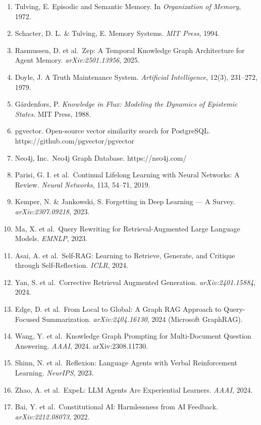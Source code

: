 \documentclass[11pt,a4paper]{article}
\begin{document}
\begin{enumerate}
  Laird, J. E. The SOAR Cognitive Architecture. \emph{MIT Press}, 2012.
\item
  Tulving, E. Episodic and Semantic Memory. In \emph{Organization of
  Memory}, 1972.
\item
  Schacter, D. L. \& Tulving, E. Memory Systems. \emph{MIT Press}, 1994.
\item
  Rasmussen, D. et al.~Zep: A Temporal Knowledge Graph Architecture for
  Agent Memory. \emph{arXiv:2501.13956}, 2025.
\item
  Doyle, J. A Truth Maintenance System. \emph{Artificial Intelligence},
  12(3), 231--272, 1979.
\item
  Gärdenfors, P. \emph{Knowledge in Flux: Modeling the Dynamics of
  Epistemic States}. MIT Press, 1988.
\item
  pgvector. Open-source vector similarity search for PostgreSQL.
  https://github.com/pgvector/pgvector
\item
  Neo4j, Inc.~Neo4j Graph Database. https://neo4j.com/
\item
  Parisi, G. I. et al.~Continual Lifelong Learning with Neural Networks:
  A Review. \emph{Neural Networks}, 113, 54--71, 2019.
\item
  Kemper, N. \& Jankowski, S. Forgetting in Deep Learning --- A Survey.
  \emph{arXiv:2307.09218}, 2023.
\item
  Ma, X. et al.~Query Rewriting for Retrieval-Augmented Large Language
  Models. \emph{EMNLP}, 2023.
\item
  Asai, A. et al.~Self-RAG: Learning to Retrieve, Generate, and Critique
  through Self-Reflection. \emph{ICLR}, 2024.
\item
  Yan, S. et al.~Corrective Retrieval Augmented Generation.
  \emph{arXiv:2401.15884}, 2024.
\item
  Edge, D. et al.~From Local to Global: A Graph RAG Approach to
  Query-Focused Summarization. \emph{arXiv:2404.16130}, 2024 (Microsoft
  GraphRAG).
\item
  Wang, Y. et al.~Knowledge Graph Prompting for Multi-Document Question
  Answering. \emph{AAAI}, 2024. arXiv:2308.11730.
\item
  Shinn, N. et al.~Reflexion: Language Agents with Verbal Reinforcement
  Learning. \emph{NeurIPS}, 2023.
\item
  Zhao, A. et al.~ExpeL: LLM Agents Are Experiential Learners.
  \emph{AAAI}, 2024.
\item
  Bai, Y. et al.~Constitutional AI: Harmlessness from AI Feedback.
  \emph{arXiv:2212.08073}, 2022.

\end{enumerate}
\end{document}
